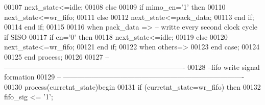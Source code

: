 \begin{DoxyCode}
00107                 \textcolor{vhdlchar}{next_state}\textcolor{vhdlchar}{<=}\textcolor{vhdlchar}{idle};
00108             \textcolor{keywordflow}{else}
00109               \textcolor{keywordflow}{if} \textcolor{vhdlchar}{mimo_en}\textcolor{vhdlchar}{=}\textcolor{vhdlchar}{'}\textcolor{vhdllogic}{}\textcolor{vhdllogic}{1}\textcolor{vhdlchar}{'} \textcolor{keywordflow}{then}  
00110                   \textcolor{vhdlchar}{next_state}\textcolor{vhdlchar}{<=}\textcolor{vhdlchar}{wr\_fifo};
00111                 \textcolor{keywordflow}{else} 
00112           \textcolor{vhdlchar}{next_state}\textcolor{vhdlchar}{<=}\textcolor{vhdlchar}{pack\_data};
00113         \textcolor{keywordflow}{end} \textcolor{keywordflow}{if}; 
00114             \textcolor{keywordflow}{end} \textcolor{keywordflow}{if};
00115             
00116         \textcolor{keywordflow}{when} \textcolor{vhdlchar}{pack\_data} \textcolor{vhdlchar}{=}\textcolor{vhdlchar}{>}\textcolor{keyword}{             -- writte every second clock cycle if SISO}
00117                     \textcolor{keywordflow}{if} \textcolor{vhdlchar}{en}\textcolor{vhdlchar}{=}\textcolor{vhdlchar}{'}\textcolor{vhdllogic}{}\textcolor{vhdllogic}{0}\textcolor{vhdlchar}{'} \textcolor{keywordflow}{then} 
00118                     \textcolor{vhdlchar}{next_state}\textcolor{vhdlchar}{<=}\textcolor{vhdlchar}{idle};
00119                   \textcolor{keywordflow}{else}
00120                     \textcolor{vhdlchar}{next_state}\textcolor{vhdlchar}{<=}\textcolor{vhdlchar}{wr\_fifo};
00121                    \textcolor{keywordflow}{end} \textcolor{keywordflow}{if};  
00122         \textcolor{keywordflow}{when} \textcolor{keywordflow}{others}\textcolor{vhdlchar}{=}\textcolor{vhdlchar}{>}
00123         \textcolor{keywordflow}{end} \textcolor{keywordflow}{case};
00124         
00125 \textcolor{keywordflow}{end} \textcolor{keywordflow}{process};
00126 
00127 \textcolor{keyword}{-- ----------------------------------------------------------------------------}
00128 \textcolor{keyword}{--fifo write signal formation }
00129 \textcolor{keyword}{-- ----------------------------------------------------------------------------}
00130 \textcolor{keywordflow}{process}(curretnt_state)\textcolor{keywordflow}{begin}
00131     \textcolor{keywordflow}{if} \textcolor{vhdlchar}{(}\textcolor{vhdlchar}{curretnt_state}\textcolor{vhdlchar}{=}\textcolor{vhdlchar}{wr\_fifo}\textcolor{vhdlchar}{)} \textcolor{keywordflow}{then}
00132           \textcolor{vhdlchar}{fifo_sig} \textcolor{vhdlchar}{<=} \textcolor{vhdlchar}{'}\textcolor{vhdllogic}{}\textcolor{vhdllogic}{1}\textcolor{vhdlchar}{'}; 

\end{DoxyCode}
